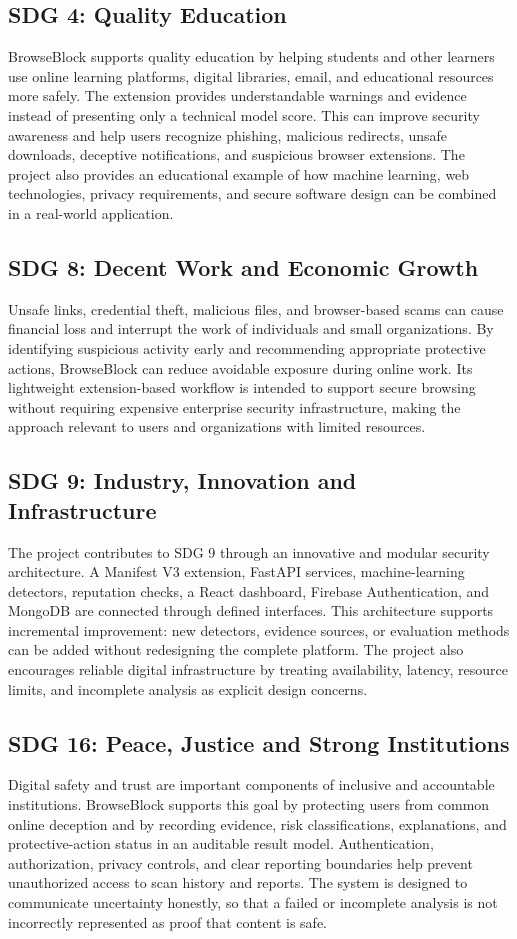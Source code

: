\subsection{SDG 4: Quality Education}
BrowseBlock supports quality education by helping students and other learners
use online learning platforms, digital libraries, email, and educational
resources more safely. The extension provides understandable warnings and
evidence instead of presenting only a technical model score. This can improve
security awareness and help users recognize phishing, malicious redirects,
unsafe downloads, deceptive notifications, and suspicious browser extensions.
The project also provides an educational example of how machine learning,
web technologies, privacy requirements, and secure software design can be
combined in a real-world application.

\subsection{SDG 8: Decent Work and Economic Growth}
Unsafe links, credential theft, malicious files, and browser-based scams can
cause financial loss and interrupt the work of individuals and small
organizations. By identifying suspicious activity early and recommending
appropriate protective actions, BrowseBlock can reduce avoidable exposure
during online work. Its lightweight extension-based workflow is intended to
support secure browsing without requiring expensive enterprise security
infrastructure, making the approach relevant to users and organizations with
limited resources.

\subsection{SDG 9: Industry, Innovation and Infrastructure}
The project contributes to SDG 9 through an innovative and modular security
architecture. A Manifest V3 extension, FastAPI services, machine-learning
detectors, reputation checks, a React dashboard, Firebase Authentication, and
MongoDB are connected through defined interfaces. This architecture supports
incremental improvement: new detectors, evidence sources, or evaluation
methods can be added without redesigning the complete platform. The project
also encourages reliable digital infrastructure by treating availability,
latency, resource limits, and incomplete analysis as explicit design concerns.

\subsection{SDG 16: Peace, Justice and Strong Institutions}
Digital safety and trust are important components of inclusive and accountable
institutions. BrowseBlock supports this goal by protecting users from common
online deception and by recording evidence, risk classifications, explanations,
and protective-action status in an auditable result model. Authentication,
authorization, privacy controls, and clear reporting boundaries help prevent
unauthorized access to scan history and reports. The system is designed to
communicate uncertainty honestly, so that a failed or incomplete analysis is
not incorrectly represented as proof that content is safe.

